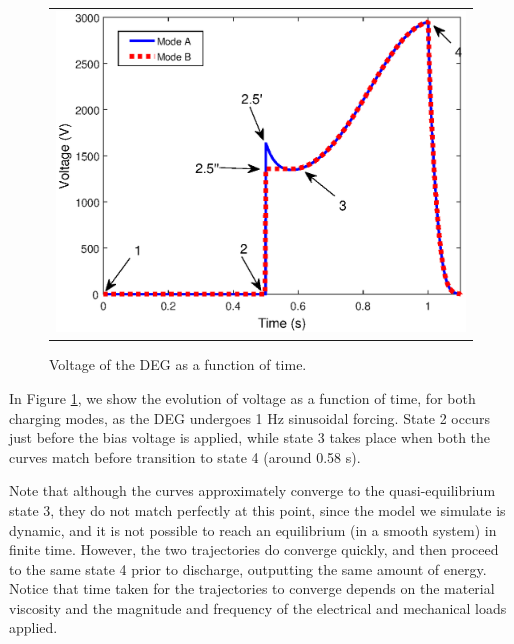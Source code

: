    \begin{figure}[htb]
   \begin{center}
   \begin{tabular}{c} %
   \includegraphics[scale=0.8]{fig02/Fig4_unit.eps}
   \end{tabular}
   \end{center}
   \caption[example] 
   { \label{fig:Cycle txV} 
Voltage of the DEG as a function of time.}
   \end{figure}  



In Figure \ref{fig:Cycle txV}, we show the evolution of voltage as a function of time, for both charging modes, as the DEG undergoes 1 Hz sinusoidal forcing. State 2 occurs just before the bias voltage is applied, while state 3 takes place when both the curves match before transition to state 4 (around 0.58 s). 

Note that although the curves approximately converge to the quasi-equilibrium state 3, they do not match perfectly at this point, since the model we simulate is dynamic, and it is not possible to reach an equilibrium (in a smooth system) in finite time. However, the two trajectories do converge quickly, and then proceed to the same state 4 prior to discharge, outputting the same amount of energy. Notice that time taken for the trajectories to converge depends on the material viscosity and the magnitude and frequency of the electrical and mechanical loads applied.

